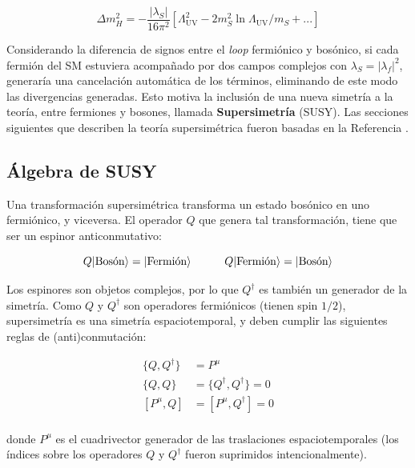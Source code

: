 \begin{equation}
	\Delta m_H^2 = - \frac{|\lambda_S|}{16 \pi^2}\left[\Lambda_{\text{UV}}^2 - 2m_S^2 \ln{\Lambda_{\text{UV}}/m_S} + ... \right]
\end{equation}

Considerando la diferencia de signos entre el \textit{loop} fermiónico y bosónico, si cada fermión del SM estuviera acompañado por dos campos complejos con $\lambda_S = |\lambda_f|^2$, generaría una cancelación automática de los términos, eliminando de este modo las divergencias generadas. Esto motiva la inclusión de una nueva simetría a la teoría, entre fermiones y bosones, llamada \textbf{Supersimetría} (SUSY). Las secciones siguientes que describen la teoría supersimétrica fueron basadas en la Referencia \cite{Martin:1997ns}.

\subsection{Álgebra de SUSY}

Una transformación supersimétrica transforma un estado bosónico en uno fermiónico, y viceversa. El operador $Q$ que genera tal transformación, tiene que ser un espinor anticonmutativo:

\begin{equation}
	Q\lvert\text{Bosón}\rangle = \lvert\text{Fermión}\rangle \quad\quad\quad Q\lvert\text{Fermión}\rangle = \lvert\text{Bosón}\rangle
\end{equation}

Los espinores son objetos complejos, por lo que $Q^{\dagger}$ es también un generador de la simetría. Como $Q$ y $Q^{\dagger}$ son operadores fermiónicos (tienen spin $1/2$), supersimetría es una simetría espaciotemporal, y deben cumplir las siguientes reglas de (anti)conmutación:

\begin{equation}
	\begin{split}	
		\{Q,Q^{\dagger}\} & = P^{\mu}\\
		\{Q,Q\} & = \{Q^{\dagger},Q^{\dagger}\} = 0\\
		[P^{\mu},Q] & = [P^{\mu},Q^{\dagger}] = 0\\
	\end{split}	
\end{equation}

\noindent
donde $P^{\mu}$ es el cuadrivector generador de las traslaciones espaciotemporales (los índices sobre los operadores $Q$ y $Q^{\dagger}$ fueron suprimidos intencionalmente).



